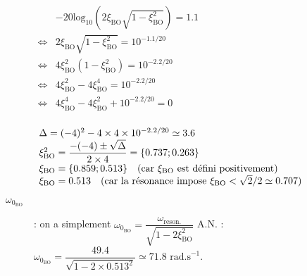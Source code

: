 \begin{corrige}
\begin{description}
\begin{minipage}{.35\textwidth}
\def\arraystretch{2}
$\begin{array}{ll}
&- 20 \text{log}_{10}\left( 2\xi_\text{BO} \sqrt{1 - \xi_\text{BO}^2}\right) = 1.1\\
\Leftrightarrow & 2 \xi_\text{BO} \sqrt{1 - \xi_\text{BO}^2} = 10^{-1.1/20}\\
\Leftrightarrow & 4 \xi_\text{BO}^2 \left(1 - \xi_\text{BO}^2\right) = 10^{-2.2/20}\\
\Leftrightarrow & 4 \xi_\text{BO}^2 - 4 \xi_\text{BO}^4 = 10^{-2.2/20}\\
\Leftrightarrow & 4 \xi_\text{BO}^4 - 4 \xi_\text{BO}^2 + 10^{-2.2/20} = 0\\
\end{array}
$
\end{minipage}
\begin{minipage}{.65\textwidth}
\def\arraystretch{2}
$\begin{array}{l}
\Delta = (-4)^2 - 4 \times 4 \times 10^{-2.2/20} \simeq 3.6\\
\xi_\text{BO}^2 = \dfrac{-(-4)\pm\sqrt{\Delta}}{2 \times 4} = \{0.737; 0.263\} \\
\xi_\text{BO} = \{0.859; 0.513\}  \text{\quad (car $\xi_\text{BO}$ est défini positivement)}\\
\xi_\text{BO} = 0.513  \text{\quad (car la résonance impose $\xi_\text{BO} < \sqrt{2}/2 \simeq 0.707$)}
\end{array}
$
\end{minipage}


\item[$\omega_{0_\text{BO}}$] : on a simplement $ \omega_{0_\text{BO}} = \dfrac{\omega_\text{reson.}}{\sqrt{1 - 2 \xi_\text{BO}^2}}$
A.N. :
$ \omega_{0_\text{BO}} = \dfrac{49.4}{\displaystyle\sqrt{1 - 2 \times 0.513^2}} \simeq 71.8 \text{ rad.s}^{-1}$.
\end{description}
\end{corrige}
\else
\fi


